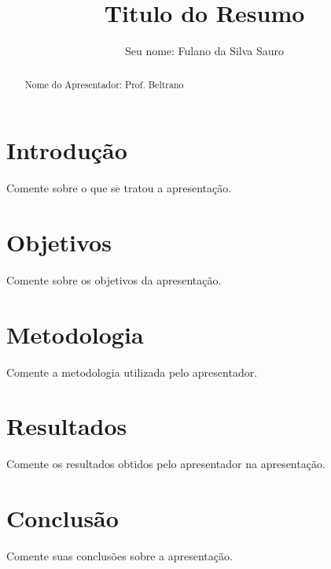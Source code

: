 \documentclass[a4paper]{article}
\title{Titulo do Resumo}
\author{Seu nome: Fulano da Silva Sauro}
\begin{document}
\maketitle

\begin{abstract}
Nome do Apresentador: Prof. Beltrano
\end{abstract}

\section{Introdução}

Comente sobre o que se tratou a apresentação.

\section{Objetivos}

Comente sobre os objetivos da apresentação.

\section{Metodologia}

Comente a metodologia utilizada pelo apresentador.

\section{Resultados}

Comente os resultados obtidos pelo apresentador na apresentação.


\section{Conclusão}

Comente suas conclusões sobre a apresentação. 
\end{document}
